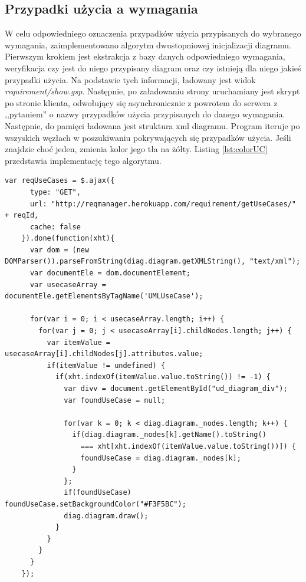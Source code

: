     \subsection{Przypadki użycia a wymagania}
    
      W celu odpowiedniego oznaczenia przypadków użycia przypisanych do wybranego wymagania, zaimplementowano algorytm dwustopniowej inicjalizacji diagramu. Pierwszym krokiem jest ekstrakcja z bazy danych odpowiedniego wymagania, weryfikacja czy jest do niego przypisany diagram oraz czy istnieją dla niego jakieś przypadki użycia. Na podstawie tych informacji, ładowany jest widok \emph{requirement/show.gsp}. Następnie, po załadowaniu strony uruchamiany jest skrypt po stronie klienta, odwołujący się asynchronicznie z powrotem do serwera z ,,pytaniem'' o nazwy przypadków użycia przypisanych do danego wymagania. Następnie, do pamięci ładowana jest struktura xml diagramu. Program iteruje po wszyskich węzłach w poszukiwaniu pokrywających się przypadków użycia. Jeśli znajdzie choć jeden, zmienia kolor jego tła na żółty. Listing \ref{lst:colorUC} przedstawia implementację tego algorytmu.
      
    
    \begin{lstlisting}[caption={Mechanizm oznaczania przypadku użycia przypisanego do aktualnie otwartego wymagania}, label={lst:colorUC}]
    var reqUseCases = $.ajax({
      type: "GET",
      url: "http://reqmanager.herokuapp.com/requirement/getUseCases/" + reqId,
      cache: false
    }).done(function(xht){ 
      var dom = (new DOMParser()).parseFromString(diag.diagram.getXMLString(), "text/xml");
      var documentEle = dom.documentElement;
      var usecaseArray = documentEle.getElementsByTagName('UMLUseCase');

      for(var i = 0; i < usecaseArray.length; i++) {
        for(var j = 0; j < usecaseArray[i].childNodes.length; j++) {
          var itemValue = usecaseArray[i].childNodes[j].attributes.value;
          if(itemValue != undefined) {
            if(xht.indexOf(itemValue.value.toString()) != -1) {
              var divv = document.getElementById("ud_diagram_div");
              var foundUseCase = null;

              for(var k = 0; k < diag.diagram._nodes.length; k++) {
                if(diag.diagram._nodes[k].getName().toString() 
                  === xht[xht.indexOf(itemValue.value.toString())]) {
                  foundUseCase = diag.diagram._nodes[k]; 
                }
              };
              if(foundUseCase) foundUseCase.setBackgroundColor("#F3F5BC");
              diag.diagram.draw();
            }
          }
        }
      }
    });
    \end{lstlisting}

